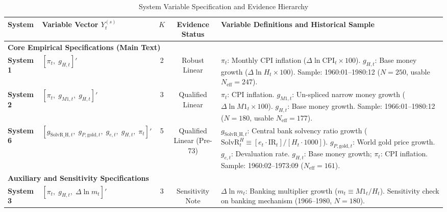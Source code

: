 \begin{table}[htbp]
\centering
\small
\renewcommand{\arraystretch}{0.88}
\caption{System Variable Specification and Evidence Hierarchy}
\label{tab:system_definitions}
\begin{tabularx}{\textwidth}{llcc>{\RaggedRight}X}
\toprule
\textbf{System} & \textbf{Variable Vector $Y^{(s)}_t$} & \textbf{$K$} & \textbf{Evidence Status} & \textbf{Variable Definitions and Historical Sample} \\
\midrule
\multicolumn{5}{l}{\textbf{Core Empirical Specifications (Main Text)}} \\
\midrule
\textbf{System 1} & $[\pi_t, \; g_{H,t}]'$ & 2 & Robust Linear & $\pi_t$: Monthly CPI inflation ($\Delta \ln \text{CPI}_t \times 100$). \newline $g_{H,t}$: Base money growth ($\Delta \ln H_t \times 100$). \newline Sample: 1960:01--1980:12 ($N=250$, usable $N_{\text{eff}}=247$). \\
\addlinespace[0.3em]
\textbf{System 2} & $[\pi_t, \; g_{M1,t}, \; g_{H,t}]'$ & 3 & Qualified Linear & $\pi_t$: CPI inflation. \newline $g_{M1,t}$: Un-spliced narrow money growth ($\Delta \ln M1_t \times 100$). \newline $g_{H,t}$: Base money growth. \newline Sample: 1966:01--1980:12 ($N=180$, usable $N_{\text{eff}}=177$). \\
\addlinespace[0.3em]
\textbf{System 6} & $[g_{\text{SolvR\_H},t}, \; g_{P,\text{gold},t}, \; g_{e,t}, \; g_{H,t}, \; \pi_t]'$ & 5 & Qualified Linear (Pre-73) & $g_{\text{SolvR\_H},t}$: Central bank solvency ratio growth ($\text{SolvR}_t^H \equiv [e_t \cdot \text{IR}_t] / [H_t \cdot 1000]$). \newline $g_{P,\text{gold},t}$: World gold price growth. \newline $g_{e,t}$: Devaluation rate. \newline $g_{H,t}$: Base money growth; $\pi_t$: CPI inflation. \newline Sample: 1960:02--1973:09 ($N_{\text{eff}}=161$). \\
\midrule
\multicolumn{5}{l}{\textbf{Auxiliary and Sensitivity Specifications}} \\
\midrule
\textbf{System 3} & $[\pi_t, \; g_{H,t}, \; \Delta \ln m_t]'$ & 3 & Sensitivity Note & $\Delta \ln m_t$: Banking multiplier growth ($m_t \equiv M1_t / H_t$). Sensitivity check on banking mechanism (1966--1980, $N=180$). \\

\end{tabularx}
\end{table}
